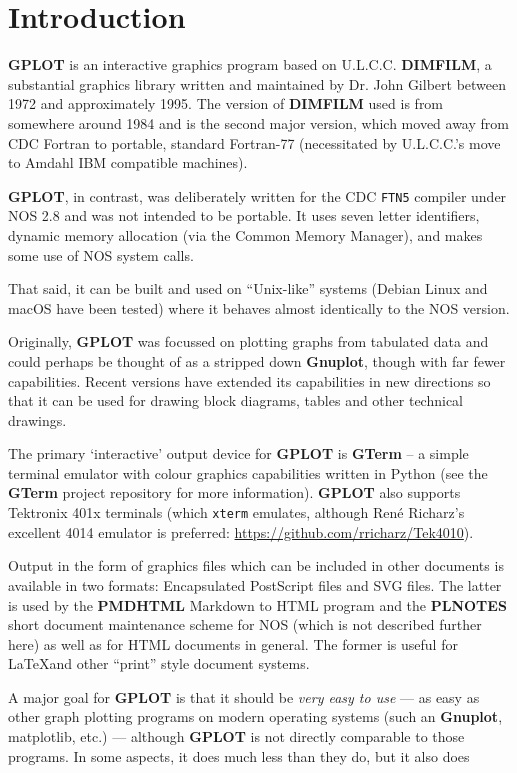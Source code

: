 \documentclass[a4paper,twoside,11pt]{article}
\newcommand{\newpara}{\par\vspace{4mm}\noindent}
\begin{document}
\section{Introduction}
\newpara
\textbf{GPLOT} is an interactive graphics program based on U.L.C.C. \textbf{DIMFILM}, a substantial graphics
library written and maintained
by Dr. John Gilbert between 1972 and approximately 1995. The version of \textbf{DIMFILM} used is
from somewhere around 1984 and is the second major version, which moved away from CDC Fortran
to portable, standard Fortran-77 (necessitated by U.L.C.C.'s move to Amdahl IBM compatible machines). 
\newpara
\textbf{GPLOT}, in contrast, was deliberately written for the CDC \texttt{FTN5} compiler under NOS 2.8 and
was not intended to be portable. It uses seven letter identifiers, dynamic memory allocation (via
the Common Memory Manager), and makes some use of NOS system calls.
\newpara
That said, it can be built and used on ``Unix-like'' systems (Debian Linux and macOS have been tested)
where it behaves almost identically to the NOS version.
\newpara
Originally, \textbf{GPLOT} was focussed on plotting graphs from tabulated data and could perhaps be thought of
as a stripped down \textbf{Gnuplot}, though with far fewer capabilities.
Recent versions have extended its capabilities in new directions so that it can be used for drawing block diagrams,
tables and other technical drawings.
\newpara
The primary `interactive' output device for \textbf{GPLOT} is \textbf{GTerm} -- a simple terminal emulator with colour graphics
capabilities written in Python (see the \textbf{GTerm} project repository for more information). \textbf{GPLOT} also 
supports Tektronix 401x terminals (which \texttt{xterm} emulates, although Ren\'{e} Richarz's
excellent 4014 emulator is preferred: \url{https://github.com/rricharz/Tek4010}).
\newpara
Output in the form of graphics files which  can be included in other documents is available in two formats:
Encapsulated PostScript files and SVG files. The latter is 
used by the \textbf{PMDHTML} Markdown to HTML program and the \textbf{PLNOTES} short document maintenance scheme for NOS
(which is not described further here) as well as for HTML documents in general. The former is useful for \LaTeX and other
``print'' style document systems.
\newpara
A major goal for \textbf{GPLOT} is that it should be \textit{very easy to use} --- as easy as other graph plotting
programs on modern operating systems (such an \textbf{Gnuplot}, matplotlib, etc.) --- although \textbf{GPLOT} is not
directly comparable to those programs. In some aspects, it does much less than they do, but it also does
\end{document}
